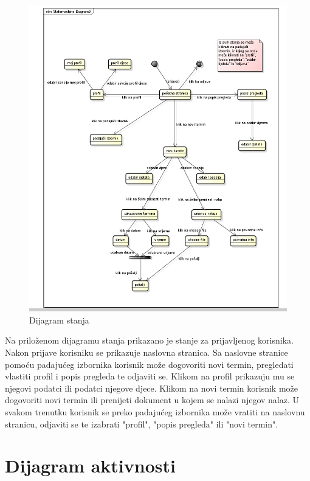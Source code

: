 			
			\begin{figure}[H]
				\includegraphics[]{dijagrami/dijagram_stanja.png}
				\caption{Dijagram stanja}
				\label{fig:dijagramStanja}
			\end{figure}
			
			Na priloženom dijagramu stanja prikazano je stanje za prijavljenog korisnika. Nakon prijave korisniku se prikazuje naslovna stranica. Sa naslovne stranice pomoću padajućeg izbornika korisnik može dogovoriti novi termin, pregledati vlastiti profil i popis pregleda te odjaviti se. Klikom na profil prikazuju mu se njegovi podatci ili podatci njegove djece. Klikom na novi termin korisnik može dogovoriti novi termin ili prenijeti dokument u kojem se nalazi njegov nalaz. U svakom trenutku korisnik se preko padajućeg izbornika može vratiti na naslovnu stranicu, odjaviti se te izabrati "profil", "popis pregleda" ili "novi termin".
			
			
			\eject 
		
		\section{Dijagram aktivnosti}
			
